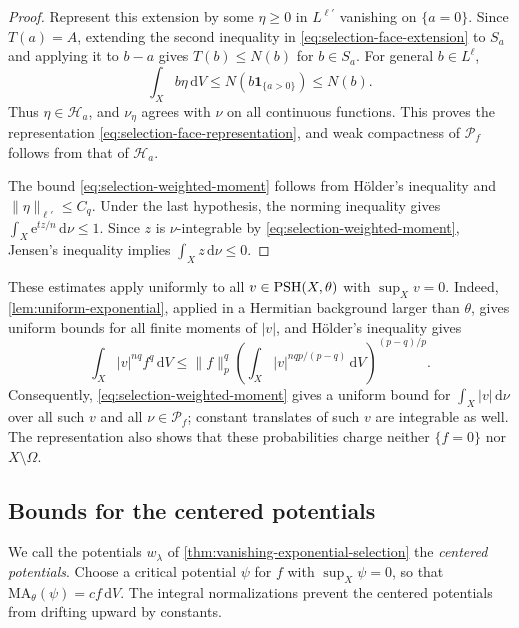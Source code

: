 \begin{proof}
Represent this extension by some $\eta\geq0$ in $L^{\ell'}$ vanishing on $\{a=0\}$. Since $T(a)=A$, extending the second inequality in \eqref{eq:selection-face-extension} to $S_a$ and applying it to $b-a$ gives $T(b)\leq N(b)$ for $b\in S_a$. For general $b\in L^\ell$,
\[
 \int_Xb\eta\,\mathrm{d}V
 \leq N(b\mathbf1_{\{a>0\}})\leq N(b).
\]
Thus $\eta\in\mathcal H_a$, and $\nu_\eta$ agrees with $\nu$ on all continuous functions. This proves the representation \eqref{eq:selection-face-representation}, and weak compactness of $\mathcal P_f$ follows from that of $\mathcal H_a$.

The bound \eqref{eq:selection-weighted-moment} follows from H\"older's inequality and $\|\eta\|_{\ell'}\leq C_q$. Under the last hypothesis, the norming inequality gives $\int_X\mathrm{e}^{tz/n}\,\mathrm{d}\nu\leq1$. Since $z$ is $\nu$-integrable by \eqref{eq:selection-weighted-moment}, Jensen's inequality implies $\int_Xz\,\mathrm{d}\nu\leq0$.
\end{proof}

These estimates apply uniformly to all $v\in\mathrm{PSH}(X,\theta)$ with $\sup_Xv=0$. Indeed, \cref{lem:uniform-exponential}, applied in a Hermitian background larger than $\theta$, gives uniform bounds for all finite moments of $|v|$, and H\"older's inequality gives
\begin{equation}\label{eq:selection-psh-moments}
 \int_X |v|^{nq} f^q\,\mathrm{d}V
 \leq \|f\|_p^q
       \left(\int_X|v|^{nqp/(p-q)}\,\mathrm{d}V\right)^{(p-q)/p}.
\end{equation}
Consequently, \eqref{eq:selection-weighted-moment} gives a uniform bound for $\int_X|v|\,\mathrm{d}\nu$ over all such $v$ and all $\nu\in\mathcal P_f$; constant translates of such $v$ are integrable as well. The representation also shows that these probabilities charge neither $\{f=0\}$ nor $X\setminus\Omega$.

\subsection{Bounds for the centered potentials}

We call the potentials $w_\lambda$ of \cref{thm:vanishing-exponential-selection} the \emph{centered potentials}. Choose a critical potential $\psi$ for $f$ with $\sup_X\psi=0$, so that $\mathrm{MA}_\theta(\psi)=cf\,\mathrm{d}V$. The integral normalizations prevent the centered potentials from drifting upward by constants.

